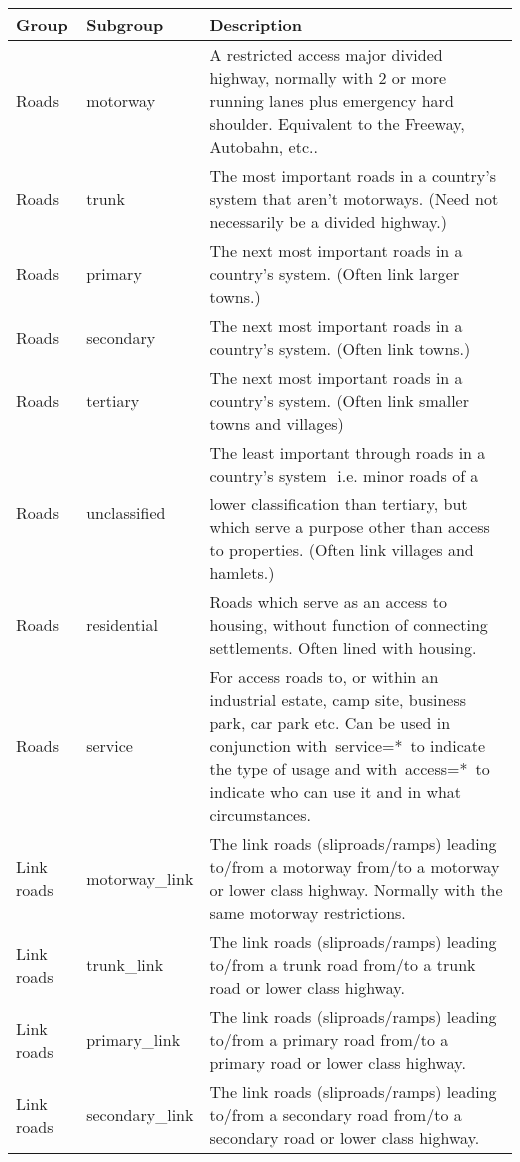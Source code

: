 \begin{tabular}{lll}
  \toprule
Group & Subgroup & Description \\ 
  \midrule
Roads & motorway & A restricted access major divided highway, normally with 2 or more running lanes plus emergency hard shoulder. Equivalent to the Freeway, Autobahn, etc.. \\ 
  Roads & trunk & The most important roads in a country's system that aren't motorways. (Need not necessarily be a divided highway.) \\ 
  Roads & primary & The next most important roads in a country's system. (Often link larger towns.) \\ 
  Roads & secondary & The next most important roads in a country's system. (Often link towns.) \\ 
  Roads & tertiary & The next most important roads in a country's system. (Often link smaller towns and villages) \\ 
  Roads & unclassified & The least important through roads in a country's system  i.e. minor roads of a lower classification than tertiary, but which serve a purpose other than access to properties. (Often link villages and hamlets.) \\ 
  Roads & residential & Roads which serve as an access to housing, without function of connecting settlements. Often lined with housing. \\ 
  Roads & service & For access roads to, or within an industrial estate, camp site, business park, car park etc. Can be used in conjunction with service=* to indicate the type of usage and with access=* to indicate who can use it and in what circumstances. \\ 
  Link roads & motorway\_link & The link roads (sliproads/ramps) leading to/from a motorway from/to a motorway or lower class highway. Normally with the same motorway restrictions. \\ 
  Link roads & trunk\_link & The link roads (sliproads/ramps) leading to/from a trunk road from/to a trunk road or lower class highway. \\ 
  Link roads & primary\_link & The link roads (sliproads/ramps) leading to/from a primary road from/to a primary road or lower class highway. \\ 
  Link roads & secondary\_link & The link roads (sliproads/ramps) leading to/from a secondary road from/to a secondary road or lower class highway. \\ 

\end{tabular}
